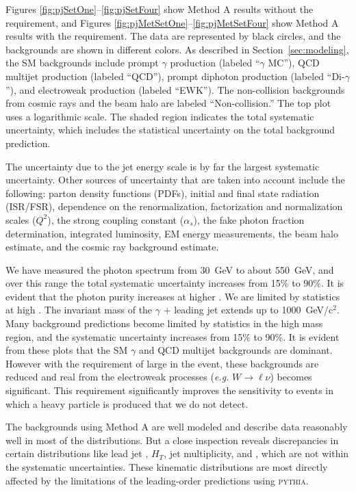 \documentclass[12pt,twoside,letterpaper,doublespace]{article}
\begin{document}
Figures \ref{fig:pjSetOne}--\ref{fig:pjSetFour} show Method A results without the \met requirement, and Figures \ref{fig:pjMetSetOne}--\ref{fig:pjMetSetFour} show Method A results with the \met requirement.  The data are represented by black circles, and the backgrounds are shown in different colors.  As described in Section~\ref{sec:modeling}, the SM backgrounds include prompt $\gamma$ production (labeled ``$\gamma$ MC''), QCD multijet production (labeled ``QCD''), prompt diphoton production (labeled ``Di-$\gamma$''), and electroweak production (labeled ``EWK'').  The non-collision backgrounds from cosmic rays and the beam halo are labeled ``Non-collision.''  The top plot uses a logarithmic scale. The shaded region indicates the total systematic uncertainty, which includes the statistical uncertainty on the total background prediction.

The uncertainty due to the jet energy scale is by far the largest systematic uncertainty. Other sources of uncertainty that are taken into account include the following:  parton density functions (PDFs), initial and final state radiation (ISR/FSR), dependence on the renormalization, factorization and normalization scales ($Q^{2}$), the strong coupling constant ($\alpha_{s}$), the fake photon fraction determination, integrated luminosity, EM energy measurements, the beam halo estimate, and the cosmic ray background estimate.

We have measured the photon \et spectrum from \mbox{30 GeV} to about \mbox{550 GeV}, and over this range the total systematic uncertainty increases from 15\% to 90\%. It is evident that the photon purity increases at higher \et.  We are limited by statistics at high \et. The invariant mass of the $\gamma$ + leading jet extends up to \mbox{1000 GeV/c$^{2}$}. Many background predictions become limited by statistics in the high mass region, and the systematic uncertainty increases from 15\% to 90\%. It is evident from these plots that the SM $\gamma$ and QCD multijet  backgrounds are dominant. However with the requirement of large \met in the event, these backgrounds are reduced and real \met from the electroweak processes ({\it e.g.} $W \to \ell \nu$) becomes significant. This \met requirement significantly improves the sensitivity to events in which a heavy particle is produced that we do not detect.

The backgrounds using Method A are well modeled and describe data reasonably well in most of the distributions. But a close inspection reveals discrepancies in certain distributions like lead jet \et, $H_{T}$, jet multiplicity, and \met, which are not within the systematic uncertainties.  These kinematic distributions are most directly affected by the limitations of the leading-order predictions using \textsc{pythia}.
\end{document}
